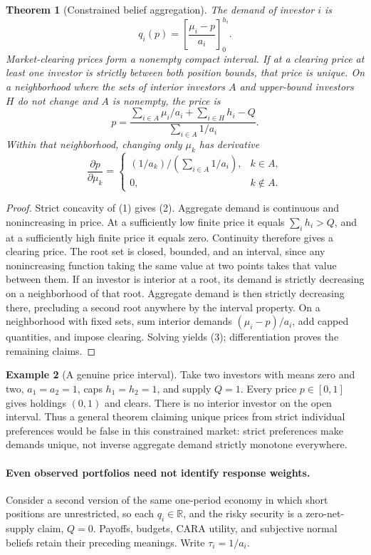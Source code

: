 \documentclass[11pt]{article}
\newtheorem{theorem}{Theorem}
\theoremstyle{definition}
\newtheorem{example}[theorem]{Example}
\begin{document}
\begin{theorem}[Constrained belief aggregation]
The demand of investor $i$ is
\[
 q_i(p)=\left[\frac{\mu_i-p}{a_i}\right]_0^{h_i}.
 \tag{2}
\]
Market-clearing prices form a nonempty compact interval. If at a clearing price at least one investor is strictly between both position bounds, that price is unique. On a neighborhood where the sets of interior investors $A$ and upper-bound investors $H$ do not change and $A$ is nonempty, the price is
\[
 p=\frac{\sum_{i\in A}\mu_i/a_i+\sum_{i\in H}h_i-Q}
          {\sum_{i\in A}1/a_i}.
 \tag{3}
\]
Within that neighborhood, changing only $\mu_k$ has derivative
\[
 \frac{\partial p}{\partial\mu_k}=
 \begin{cases}
 (1/a_k)/(\sum_{i\in A}1/a_i),&k\in A,\\
 0,&k\notin A.
 \end{cases}
\]
\end{theorem}
\begin{proof}
Strict concavity of (1) gives (2). Aggregate demand is continuous and nonincreasing in price. At a sufficiently low finite price it equals $\sum_i h_i>Q$, and at a sufficiently high finite price it equals zero. Continuity therefore gives a clearing price. The root set is closed, bounded, and an interval, since any nonincreasing function taking the same value at two points takes that value between them. If an investor is interior at a root, its demand is strictly decreasing on a neighborhood of that root. Aggregate demand is then strictly decreasing there, precluding a second root anywhere by the interval property. On a neighborhood with fixed sets, sum interior demands $(\mu_i-p)/a_i$, add capped quantities, and impose clearing. Solving yields (3); differentiation proves the remaining claims.
\end{proof}

\begin{example}[A genuine price interval]
Take two investors with means zero and two, $a_1=a_2=1$, caps $h_1=h_2=1$, and supply $Q=1$. Every price $p\in[0,1]$ gives holdings $(0,1)$ and clears. There is no interior investor on the open interval. Thus a general theorem claiming unique prices from strict individual preferences would be false in this constrained market: strict preferences make demands unique, not inverse aggregate demand strictly monotone everywhere.
\end{example}

\paragraph{Even observed portfolios need not identify response weights.}
Consider a second version of the same one-period economy in which short positions are unrestricted, so each $q_i\in\mathbb R$, and the risky security is a zero-net-supply claim, $Q=0$. Payoffs, budgets, CARA utility, and subjective normal beliefs retain their preceding meanings. Write $\tau_i=1/a_i$.
\end{document}
